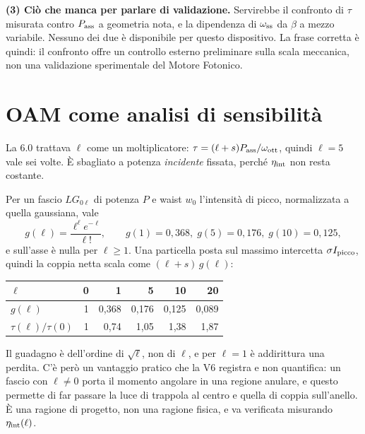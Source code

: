 \documentclass[11pt,a4paper]{article}
\providecommand{\toprule}{\hline}
\providecommand{\midrule}{\hline}
\providecommand{\bottomrule}{\hline}
\begin{document}
\textbf{(3) Ci\`o che manca per parlare di validazione.} Servirebbe il confronto di
$\tau$ misurata contro $P_{\rm ass}$ a geometria nota, e la dipendenza di
$\omega_{\rm ss}$ da $\beta$ a mezzo variabile. Nessuno dei due \`e disponibile per
questo dispositivo. La frase corretta \`e quindi: il confronto offre un controllo
esterno preliminare sulla scala meccanica, non una validazione sperimentale del
Motore Fotonico.

\section{OAM come analisi di sensibilit\`a}
\label{sec:oam}

La 6.0 trattava $\ell$ come un moltiplicatore: $\tau=(\ell+s)P_{\rm ass}/\omega_{\rm
ott}$, quindi $\ell=5$ vale sei volte. \`E sbagliato a potenza \emph{incidente}
fissata, perch\'e $\eta_{\rm int}$ non resta costante.

Per un fascio $LG_{0\ell}$ di potenza $P$ e waist $w_0$ l'intensit\`a di picco,
normalizzata a quella gaussiana, vale
\begin{equation}
g(\ell)=\frac{\ell^{\ell}e^{-\ell}}{\ell!},
\qquad g(1)=0{,}368,\; g(5)=0{,}176,\; g(10)=0{,}125,
\end{equation}
e sull'asse \`e nulla per $\ell\ge1$. Una particella posta sul massimo intercetta
$\sigma I_{\rm picco}$, quindi la coppia netta scala come $(\ell+s)\,g(\ell)$:
\begin{center}\small
\begin{tabular}{lrrrrr}
\toprule
$\ell$ & 0 & 1 & 5 & 10 & 20 \\
\midrule
$g(\ell)$ & 1 & 0,368 & 0,176 & 0,125 & 0,089 \\
$\tau(\ell)/\tau(0)$ & 1 & 0,74 & 1,05 & 1,38 & 1,87 \\
\bottomrule
\end{tabular}
\end{center}
Il guadagno \`e dell'ordine di $\sqrt{\ell}$, non di $\ell$, e per $\ell=1$ \`e
addirittura una perdita. C'\`e per\`o un vantaggio pratico che la V6 registra e non
quantifica: un fascio con $\ell\neq0$ porta il momento angolare in una regione
anulare, e questo permette di far passare la luce di trappola al centro e quella di
coppia sull'anello. \`E una ragione di progetto, non una ragione fisica, e va
verificata misurando $\eta_{\rm int}(\ell)$.
\end{document}
